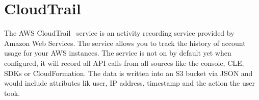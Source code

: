 \section{CloudTrail}

The AWS CloudTrail~\cite{hid-sp18-518-CloudTrail} service is an activity 
recording service provided by Amazon Web Services. The service allows you 
to track the history of account usage for your AWS instances. The service 
is not on by default yet when configured, it will record all API calls from
all sources like the console, CLE, SDKs or CloudFormation. The data is 
written into an S3 bucket via JSON and would include attributes lik user,
IP address, timestamp and the action the user took.










